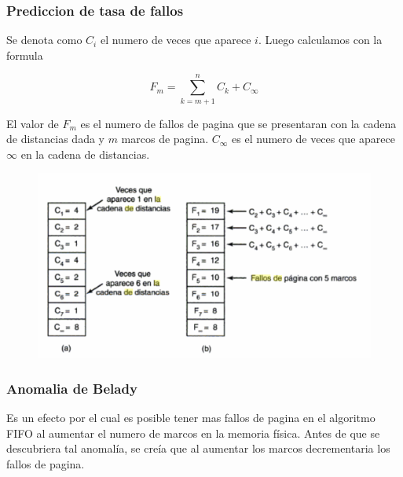 \documentclass{beamer}
\begin{document}
\begin{frame}
	\frametitle{Prediccion de tasa de fallos}
	\footnotesize
	Se denota como $C_{i}$ el numero de veces que aparece $i$. Luego calculamos con la formula 
	
	\begin{equation*}
	F_{m} = \sum_{k=m+1}^{n}C_k + C_\infty
	\end{equation*}
	
	El valor de $F_{m}$ es el numero de fallos de pagina que se presentaran con la cadena de distancias dada y $m$ marcos de pagina. $C_\infty$ es el numero de veces que aparece $\infty$ en la cadena de distancias.
	
	\begin{figure}[H]
		\centering
		\includegraphics[scale=0.4]{img/fallos.png}
	\end{figure}
\end{frame}

\begin{frame}
	\frametitle{Anomalia de Belady}
	
	Es un efecto por el cual es posible tener mas fallos de pagina en el algoritmo FIFO al aumentar el numero de marcos en la memoria física. Antes de que se descubriera tal anomalía, se creía que al aumentar los marcos decrementaria los fallos de pagina. 
	
\end{frame}
	
\end{document}
